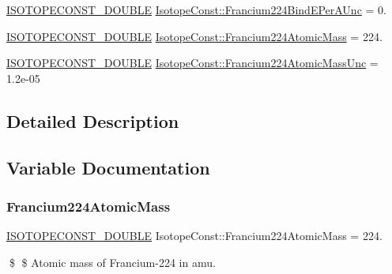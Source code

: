 \begin{DoxyCompactItemize}
\mbox{\hyperlink{group___isotope_const-_macros_ga8f45a7272ce02c0b4c65c44636ed719a}{I\+S\+O\+T\+O\+P\+E\+C\+O\+N\+S\+T\+\_\+\+D\+O\+U\+B\+LE}} \mbox{\hyperlink{group___isotope_const-_francium-_fr224_ga9c0c5d632e07a07279a02c6f290044e2}{Isotope\+Const\+::\+Francium224\+Bind\+E\+Per\+A\+Unc}} = 0.
\item 
\mbox{\hyperlink{group___isotope_const-_macros_ga8f45a7272ce02c0b4c65c44636ed719a}{I\+S\+O\+T\+O\+P\+E\+C\+O\+N\+S\+T\+\_\+\+D\+O\+U\+B\+LE}} \mbox{\hyperlink{group___isotope_const-_francium-_fr224_gab49e4b0c04e5b075104d2ee8639df22d}{Isotope\+Const\+::\+Francium224\+Atomic\+Mass}} = 224.
\item 
\mbox{\hyperlink{group___isotope_const-_macros_ga8f45a7272ce02c0b4c65c44636ed719a}{I\+S\+O\+T\+O\+P\+E\+C\+O\+N\+S\+T\+\_\+\+D\+O\+U\+B\+LE}} \mbox{\hyperlink{group___isotope_const-_francium-_fr224_ga288d6afa9abaf831bf97ab03de4a4ebe}{Isotope\+Const\+::\+Francium224\+Atomic\+Mass\+Unc}} = 1.\+2e-\/05
\end{DoxyCompactItemize}


\subsection{Detailed Description}


\subsection{Variable Documentation}
\mbox{\label{group___isotope_const-_francium-_fr224_gab49e4b0c04e5b075104d2ee8639df22d}} 
\subsubsection{\texorpdfstring{Francium224\+Atomic\+Mass}{Francium224AtomicMass}}
{\footnotesize\ttfamily \mbox{\hyperlink{group___isotope_const-_macros_ga8f45a7272ce02c0b4c65c44636ed719a}{I\+S\+O\+T\+O\+P\+E\+C\+O\+N\+S\+T\+\_\+\+D\+O\+U\+B\+LE}} Isotope\+Const\+::\+Francium224\+Atomic\+Mass = 224.}

\$ \$ Atomic mass of Francium-\/224 in amu. \mbox{\label{group___isotope_const-_francium-_fr224_ga288d6afa9abaf831bf97ab03de4a4ebe}} 
